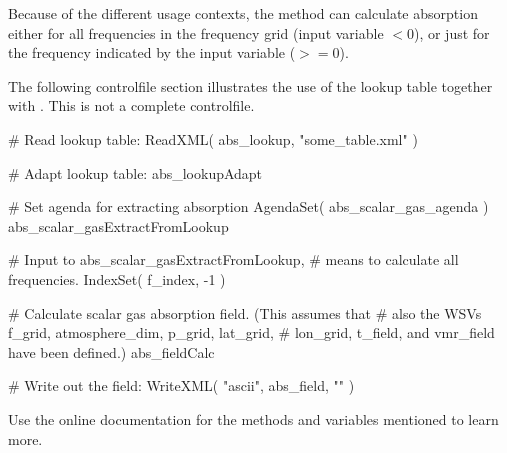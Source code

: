 Because of the different usage contexts, the method
 can calculate absorption
either for all frequencies in the frequency grid (input variable
$<$0), or just for the frequency indicated by the
input variable  ($>=$0).

The following controlfile section illustrates the use of the lookup
table together with . This is
not a complete controlfile. 

\begin{code}
# Read lookup table:
ReadXML( abs_lookup, "some_table.xml" )

# Adapt lookup table:
abs_lookupAdapt

# Set agenda for extracting absorption
AgendaSet( abs_scalar_gas_agenda ){
  abs_scalar_gasExtractFromLookup
}

# Input to abs_scalar_gasExtractFromLookup{}, 
# means to calculate all frequencies.
IndexSet( f_index, -1 )

# Calculate scalar gas absorption field. (This assumes that 
# also the WSVs f_grid, atmosphere_dim, p_grid, lat_grid, 
# lon_grid, t_field, and vmr_field have been defined.)
abs_fieldCalc

# Write out the field:
WriteXML( "ascii", abs_field, "" )
\end{code}

Use the online documentation for the methods and variables mentioned
to learn more.


